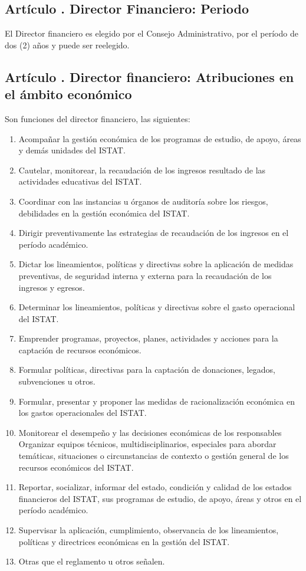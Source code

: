 \subsection{Artículo . Director Financiero: Periodo}
\addtocounter{ns}{1}
El Director financiero es elegido por el Consejo Administrativo, por el período de dos (2) años y puede ser reelegido.
\subsection{Artículo . Director financiero: Atribuciones en el ámbito económico}
\addtocounter{ns}{1}
Son funciones del director financiero, las siguientes: 
\begin{enumerate}
\item Acompañar la gestión económica de los programas de estudio, de apoyo, áreas y demás unidades del ISTAT. 
\item Cautelar, monitorear, la recaudación de los ingresos resultado de las actividades educativas del ISTAT. 
\item Coordinar con las instancias u órganos de auditoría sobre los riesgos, debilidades en la gestión económica del ISTAT. 
\item Dirigir preventivamente las estrategias de recaudación de los ingresos en el período académico.  
\item Dictar los lineamientos, políticas y directivas sobre la aplicación de medidas preventivas, de seguridad interna y externa para la recaudación de los ingresos y egresos. 
\item Determinar los lineamientos, políticas y directivas sobre el gasto operacional del ISTAT. 
\item Emprender programas, proyectos, planes, actividades y acciones para la captación de recursos económicos. 
\item Formular políticas, directivas para la captación de donaciones, legados, subvenciones u otros. 
\item Formular, presentar y proponer las medidas de racionalización económica en los gastos operacionales del ISTAT. 
\item Monitorear el desempeño y las decisiones económicas de los responsables Organizar equipos técnicos, multidisciplinarios, especiales para abordar temáticas, situaciones o circunstancias de contexto o gestión general de los recursos económicos del ISTAT. 
\item Reportar, socializar, informar del estado, condición y calidad de los estados financieros del ISTAT, sus programas de estudio, de apoyo, áreas y otros en el período académico. 
\item Supervisar la aplicación, cumplimiento, observancia de los lineamientos, políticas y directrices económicas en la gestión del ISTAT. 
\item Otras que el reglamento u otros señalen. 
\end{enumerate}
